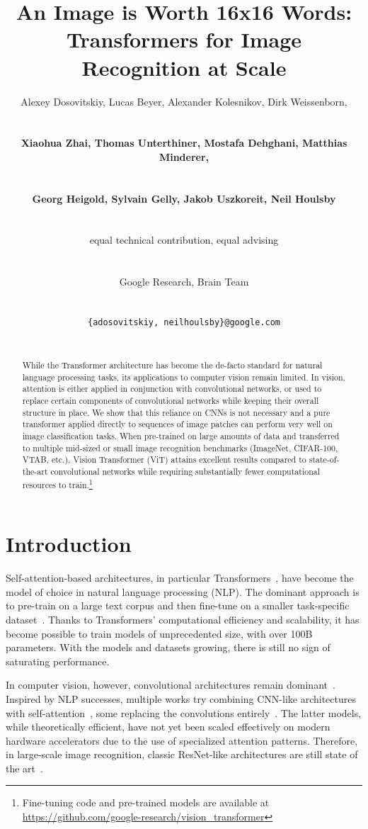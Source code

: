 \documentclass{article} \usepackage{iclr2021_conference,times}
\title{An Image is Worth 16x16 Words:\\ Transformers for Image Recognition at Scale}
\author{
\centerline{Alexey Dosovitskiy, Lucas Beyer, Alexander Kolesnikov, Dirk Weissenborn,} \vspace{1mm}\\
\centerline{\textbf{Xiaohua Zhai, Thomas Unterthiner, Mostafa Dehghani, Matthias Minderer,}} \vspace{0.5mm} \\
\centerline{\textbf{Georg Heigold, Sylvain Gelly, Jakob Uszkoreit, Neil Houlsby}} \vspace{0.7mm} \\
\centerline{equal technical contribution, equal advising}  \vspace{0.7mm} \\
\centerline{Google Research, Brain Team}  \vspace{0.8mm} \\
\centerline{\texttt{\{adosovitskiy, neilhoulsby\}@google.com}} \\
}
\newcommand{\oursabbrv}{ViT\xspace}
\newcommand{\oursfull}{Vision Transformer\xspace}
\newcommand{\imagenet}{ImageNet\xspace}
\begin{document}
\maketitle

\begin{abstract}
While the Transformer architecture has become the de-facto standard for natural language processing tasks, its applications to computer vision remain limited.
In vision, attention is either applied in conjunction with convolutional networks, or used to replace certain components of convolutional networks while keeping their overall structure in place.
We show that this reliance on CNNs is not necessary and a pure transformer applied directly to sequences of image patches can perform very well on image classification tasks.
When pre-trained on large amounts of data and transferred to multiple mid-sized or small image recognition benchmarks (\imagenet, CIFAR-100, VTAB, etc.), \oursfull{} (\oursabbrv) attains excellent results compared to state-of-the-art convolutional networks while requiring substantially fewer computational resources to train.\footnote{Fine-tuning code and pre-trained models are available at \url{https://github.com/google-research/vision_transformer}}


\end{abstract}

\section{Introduction}


Self-attention-based architectures, in particular Transformers~\citep{vaswani2017}, have become the model of choice in natural language processing (NLP).
The dominant approach is to pre-train on a large text corpus and then fine-tune on a smaller task-specific dataset~\citep{devlin19-bert}.
Thanks to Transformers' computational efficiency and scalability, it has become possible to train models of unprecedented size, with over 100B parameters.
With the models and datasets growing, there is still no sign of saturating performance.


In computer vision, however, convolutional architectures remain dominant~\citep{LeCun1989BackpropagationAT,KrizhevskyNIPS12,he2016deep}.
Inspired by NLP successes, multiple works try combining CNN-like architectures with self-attention~\citep{wang2018-nonlocalnn,carion20-detr}, some replacing the convolutions entirely~\citep{ramachandran19-sasa,wang2020-axialdeeplab}.
The latter models, while theoretically efficient, have not yet been scaled effectively on modern hardware accelerators due to the use of specialized attention patterns.
Therefore, in large-scale image recognition, classic ResNet-like architectures are still state of the art~\citep{mahajan2018,xie2020-noisystudent,kolesnikov2020-bit}.
\end{document}

